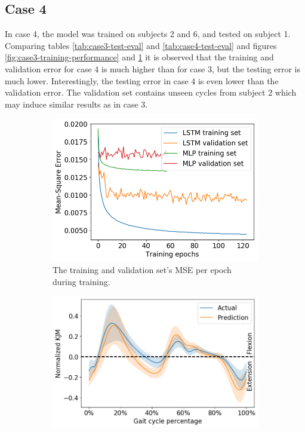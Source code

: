 \documentclass[../main.tex]{subfiles}
\begin{document}
\subsection{Case 4}
\label{sec:results-case4}
In case 4, the model was trained on subjects 2 and 6, and tested on subject 1.
Comparing tables \ref{tab:case3-test-eval} and \ref{tab:case4-test-eval} and figures \ref{fig:case3-training-performance} and \ref{fig:case4-training-performance} it is observed that the training and validation error for case 4 is much higher than for case 3, but the testing error is much lower.
Interestingly, the testing error in case 4 is even lower than the validation error.
The validation set contains unseen cycles from subject 2 which may induce similar results as in case 3.
\begin{figure}[!htb]
     \centering
     \begin{subfigure}[b]{0.475\textwidth}
         \centering
         \includegraphics[width=\textwidth]{img/results/training_history/Case4_LSTMvsMLP_training.png}
         \caption{The training and validation set's \ac{MSE} per epoch during training.}
         \label{fig:case4-training-performance}
     \end{subfigure}
     \hfill
     \begin{subfigure}[b]{0.515\textwidth}
         \centering
         \includegraphics[width=\textwidth]{img/results/test_prediction_evaluation/Case4_LSTM_test_prediction.png}

\end{subfigure}
\end{figure}
\end{document}
